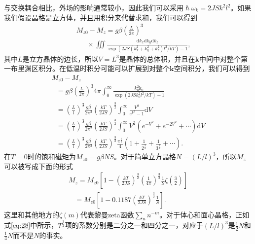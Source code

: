 \documentclass{article}
\begin{document}
与交换耦合相比，外场的影响通常较小，因此我们可以采用$\hslash\omega_k=2JSk^2l^2$。如果我们假设晶格是立方体，并且用积分来代替求和，我们可以得到
\begin{eqnarray} \label{eq:26}
&&M_{z0}-M_{z}=g\beta\left(\frac{L}{2\pi}\right)^3\nonumber\\
&&\phantom{~~~~~~~}\times\iiint\frac{\mathrm{d}k_x\mathrm{d}k_y\mathrm{d}k_z}{\exp(2JS(k_x^2+k_y^2+k_z^2)l^2/kT)-1},
\end{eqnarray}
其中$L$是立方晶体的边长，所以$V=L^3$是晶体的总体积，并且在$\mathbf{k}$中间中对整个第一布里渊区积分。在低温时积分可能可以扩展到对整个$\mathbf{k}$空间积分，我们可以得到
\begin{equation} \label{eq:27}
\begin{array}{l}
M_{z0}-M_z\\
\phantom{~~~}=g\beta\displaystyle\left(\frac{L}{2\pi}\right)^3 4\pi\int_0^\infty\frac{k_0^2\mathrm{k_0}}{\exp(2JSk_0^2l^2/kT)-1}\\
\phantom{~~~}=\displaystyle\left(\frac{L}{l}\right)^3\frac{g\beta}{2\pi^2}\left(\frac{kT}{2JS}\right)^{\frac{3}{2}}\int_0^\infty\frac{V^2}{e^{V^2}-1}\mathrm{d}V\\
\phantom{~~~}=\displaystyle\left(\frac{L}{l}\right)^3\frac{g\beta}{2\pi^2}\left(\frac{kT}{2JS}\right)^{\frac{3}{2}}\int_0^\infty V^2(e^{-V^2}+e^{-2V^2}+\cdots)\mathrm{d}V\\
\phantom{~~~}=\displaystyle\left(\frac{L}{l}\right)^3\frac{g\beta}{2\pi^2}\left(\frac{kT}{2JS}\right)^{\frac{3}{2}}\frac{\pi^{\frac{1}{2}}}{4}\left(1+\frac{1}{2^{\frac{3}{2}}}+\frac{1}{3^{\frac{3}{2}}}+\cdots\right).
\end{array}
\end{equation}
在$T=0$时的饱和磁矩为$M_{z0}=g\beta NS$。对于简单立方晶格$N=(L/l)^3$，所以$M_z$可以被写成下面的形式
\begin{equation} \label{eq:28}
\begin{array}{l}
M_z=M_{z0}\displaystyle\left[1-\left(\frac{kT}{2JS}\right)^{\frac{3}{2}}\left(\frac{1}{4\pi}\right)^{\frac{3}{2}}\frac{1}{S}\zeta(\frac{3}{2})\right]\\
\phantom{~~~~}=\displaystyle M_{z0}\left[1-0.1187\left(\frac{kT}{2JS}\right)^{\frac{3}{2}}\frac{1}{S}\right].
\end{array}
\end{equation}
这里和其他地方的$\zeta(m)$代表黎曼zeta函数$\sum_n n^{-m}$。对于体心和面心晶格，正如式\eqref{eq:28}中所示，$T^{\frac{3}{2}}$项的系数分别是二分之一和四分之一，对应于$(L/l)^3$是$\tfrac{1}{2}N$和$\tfrac{1}{4}N$而不是$N$的事实。
\end{document}
